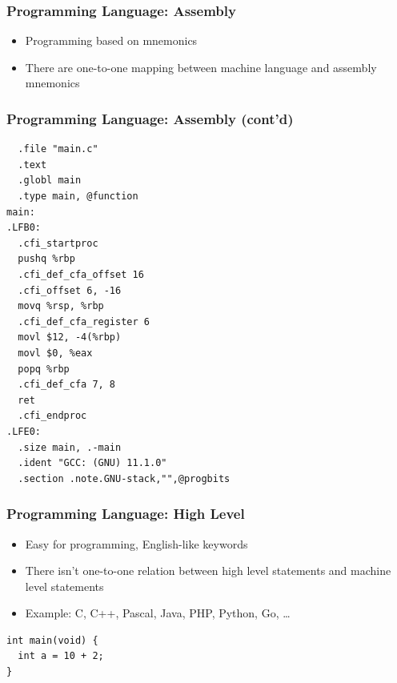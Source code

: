 \documentclass{../c-lecture}
\begin{document}
\begin{frame}
  \frametitle{Programming Language: Assembly}
  \begin{itemize}
    \item Programming based on mnemonics
    \item
      There are {\color{Orange} one-to-one mapping} between
      machine language and assembly mnemonics
  \end{itemize}
\end{frame}
\begin{frame}[fragile]
  \frametitle{Programming Language: Assembly (cont'd)}
  \scriptsize
  \begin{verbatim}
  .file "main.c"
  .text
  .globl main
  .type main, @function
main:
.LFB0:
  .cfi_startproc
  pushq %rbp
  .cfi_def_cfa_offset 16
  .cfi_offset 6, -16
  movq %rsp, %rbp
  .cfi_def_cfa_register 6
  movl $12, -4(%rbp)
  movl $0, %eax
  popq %rbp
  .cfi_def_cfa 7, 8
  ret
  .cfi_endproc
.LFE0:
  .size main, .-main
  .ident "GCC: (GNU) 11.1.0"
  .section .note.GNU-stack,"",@progbits
  \end{verbatim}
\end{frame}

\begin{frame}[fragile]
  \frametitle{Programming Language: High Level}
  \begin{itemize}
    \item Easy for programming, English-like keywords
    \item
      There isn’t one-to-one relation between high level statements and machine
      level statements
    \item Example: C, C++, Pascal, Java, PHP, Python, Go, \ldots
  \end{itemize}
  \begin{verbatim}
int main(void) {
  int a = 10 + 2;
}
  \end{verbatim}
\end{frame}
\end{document}
